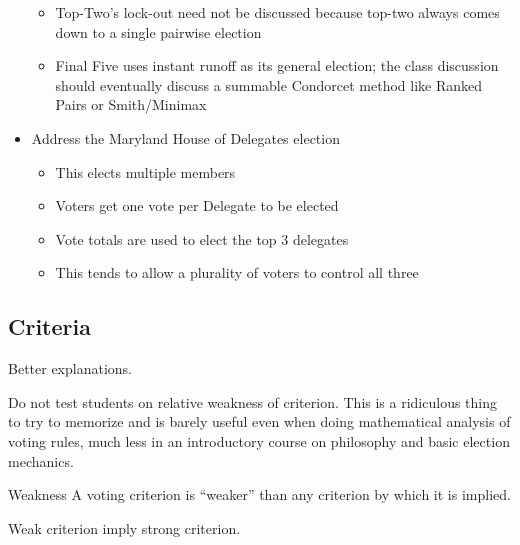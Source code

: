 \begin{itemize}
\begin{itemize}
        \item Top-Two's lock-out need not be discussed because top-two always comes down to a single pairwise election

        \item Final Five uses instant runoff as its general election; the class discussion should eventually discuss a summable Condorcet method like Ranked Pairs or Smith/Minimax
    \end{itemize}

    \item Address the Maryland House of Delegates election
    \begin{itemize}
        \item This elects multiple members

        \item Voters get one vote per Delegate to be elected

        \item Vote totals are used to elect the top 3 delegates

        \item This tends to allow a plurality of voters to control all three
    \end{itemize}
\end{itemize}

\subsection{Criteria}
\begin{todo}
    Better explanations.
\end{todo}

\begin{boxcomment}
    Do not test students on relative weakness of criterion.  This is a ridiculous thing to try to memorize and is barely useful even when doing mathematical analysis of voting rules, much less in an introductory course on philosophy and basic election mechanics.
\end{boxcomment}

\begin{definition}{Weakness}
    A voting criterion is ``weaker'' than any criterion by which it is implied.
\end{definition}

Weak criterion imply strong criterion.

